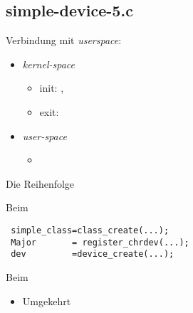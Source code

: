 \subsection{simple-device-5.c}
\begin{frame}{}{Verbindung mit {\em userspace}: }
 \begin{itemize}
  \item {\em kernel-space}
  \begin{itemize}
   \item init: ,
   \item exit: 
  \end{itemize}
  \item {\em user-space}
  \begin{itemize}
   \item {}
  \end{itemize}
 \end{itemize}
\end{frame}

\begin{frame}[fragile]{Die Reihenfolge}
\begin{block}{Beim }
\begin{lstlisting}
 simple_class=class_create(...);
 Major       = register_chrdev(...);
 dev         =device_create(...);
\end{lstlisting}
\end{block}
\begin{block}{Beim }
 \begin{itemize}
  \item Umgekehrt
 \end{itemize}
\end{block}
\end{frame} 
